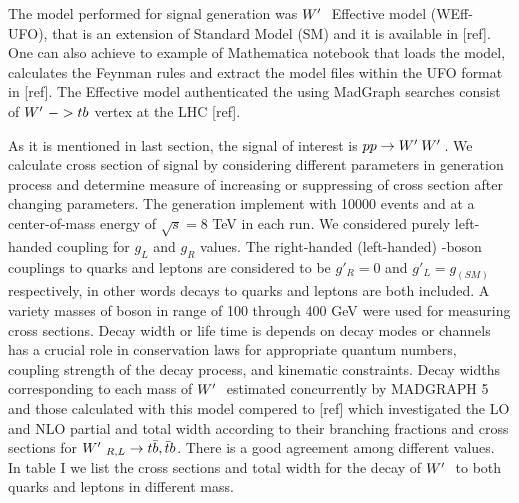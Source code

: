  The model performed for signal generation was $W^\prime~$ Effective model {\small (WEff-UFO)}, that is an extension of Standard Model {\small (SM)} and it is available in [ref]. One can also achieve to example of Mathematica notebook that loads the model, calculates the Feynman rules and extract the model files within the UFO format in [ref]. The \wprime Effective model authenticated the using MadGraph searches consist of $W^\prime~ -> tb$ vertex at the LHC [ref].
 
  As it is mentioned in last section, the signal of interest is $ pp\rightarrow {\tiny \ensuremath{W^\prime}~\ensuremath{W^\prime}~} $. We calculate cross section of signal by considering different parameters in generation process and determine measure of increasing or suppressing of cross section after changing parameters. The generation implement with 10000 events and at a center-of-mass energy of $ \sqrt{s}=8 $ TeV in each run. We considered purely left-handed coupling  for $ g_L $ and $ g_R $ values.  The right-handed (left-handed) \wprime-boson couplings to quarks and leptons are considered to be $g'_R = 0$ and $g'_L = g_{(SM)}$ respectively, in other words decays to quarks and leptons are both included. A variety masses of \wprime boson in range of 100 through 400 GeV were used for measuring cross sections.  Decay width or life time is depends on decay modes or channels has a crucial role in conservation laws for appropriate quantum numbers, coupling strength of the decay process, and kinematic constraints. Decay widths corresponding to each mass of $ W^\prime~ $ estimated concurrently by {\small MADGRAPH 5} and those calculated with this model compered to [ref] which investigated the LO and NLO partial and total width according to their branching fractions and cross sections for  $ W^\prime~_{R,L}\rightarrow t \bar{b},\bar{t}b $.  There is a good agreement among different values.  In table I we list the cross sections and total width for the decay of $ W^\prime~ $ to both quarks and leptons in different mass. 

